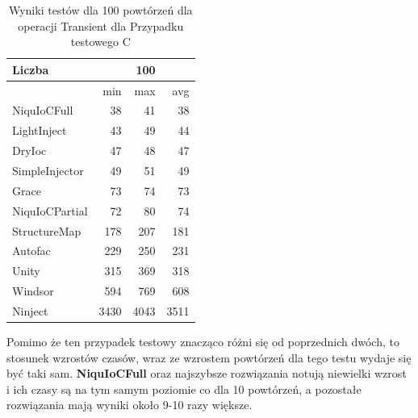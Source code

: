 \documentclass[12pt]{article}
\begin{document}
\begin{table}[H]
\captionsetup{belowskip=0pt,aboveskip=0pt}
\begin{center}
\begin{small}
	\begin{tabular}{ | l | r r r | }
    		\hline
Liczba & & 100 & \\ \hline
 & min & max & avg \\ \hline
NiquIoCFull & 38 & 41 & 38 \\ \hline
LightInject & 43 & 49 & 44 \\ \hline
DryIoc & 47 & 48 & 47 \\ \hline
SimpleInjector & 49 & 51 & 49 \\ \hline
Grace & 73 & 74 & 73 \\ \hline
NiquIoCPartial & 72 & 80 & 74 \\ \hline
StructureMap & 178 & 207 & 181 \\ \hline
Autofac & 229 & 250 & 231 \\ \hline
Unity & 315 & 369 & 318 \\ \hline
Windsor & 594 & 769 & 608 \\ \hline
Ninject & 3430 & 4043 & 3511 \\ \hline
  	\end{tabular}
\end{small}
\end{center}
\caption{Wyniki testów dla 100 powtórzeń dla operacji Transient dla Przypadku testowego C}
\label{TestCaseC_Transient100}
\end{table}
Pomimo że ten przypadek testowy znacząco różni się od poprzednich dwóch, to stosunek wzrostów czasów, wraz ze wzrostem powtórzeń dla tego testu wydaje się być taki sam. \textbf{NiquIoCFull} oraz najszybsze rozwiązania notują niewielki wzrost i ich czasy są na tym samym poziomie co dla 10 powtórzeń, a pozostałe rozwiązania mają wyniki około 9-10 razy większe.
\\ \\
\end{document}
